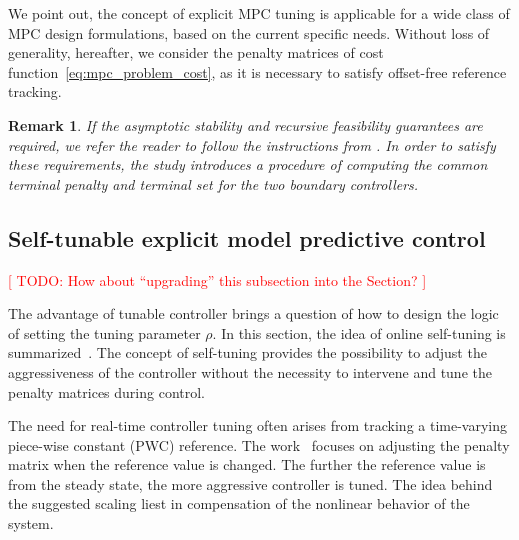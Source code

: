 \documentclass[preprint,12pt]{elsarticle}
\newtheorem{remark}[theorem]{Remark}
\begin{document}
We point out, the concept of explicit MPC tuning is applicable for a wide class of MPC design formulations, based on the current specific needs. Without loss of generality, hereafter, we consider the penalty matrices of cost function~\eqref{eq:mpc_problem_cost}, as it is necessary to satisfy offset-free reference tracking.

\begin{remark}
	If the asymptotic stability and recursive feasibility guarantees are required, we refer the reader to follow the instructions from \cite{Oravec_tunable}. In order to satisfy these requirements, the study introduces a procedure of computing the common terminal penalty and terminal set for the two boundary controllers. 
\end{remark}

\subsection{Self-tunable explicit model predictive control}
\label{sec:self_tunable}

\textcolor{red}{[ TODO: How about ``upgrading'' this subsection into the Section? ]}

The advantage of tunable controller brings a question of how to design the logic of setting the tuning parameter $\rho$. In this section, the idea of online self-tuning is summarized~\cite{self_tunable}. The concept of self-tuning provides the possibility to adjust the aggressiveness of the controller without the necessity to intervene and tune the penalty matrices during control. 

The need for real-time controller tuning often arises from tracking a time-varying piece-wise constant (PWC) reference. The work~\cite{self_tunable} focuses on adjusting the penalty matrix when the reference value is changed. The further the reference value is from the steady state, the more aggressive controller is tuned. The idea behind the suggested scaling liest in compensation of the nonlinear behavior of the system.  
\end{document}
